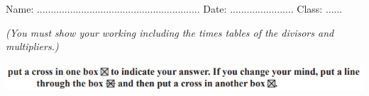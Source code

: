 \documentclass{article}
\date{}
\begin{document}
\fontsize{13}{15} \selectfont %

\begin{center}
  \qquad \\ 
\end{center} \\ 

Name: ...........................................................  \hspace{0.5cm}  Date: ....................... \hspace{0.5cm}  Class: ......\hspace{0.5cm} %

\par
\vspace*{5pt} 
\textit{(You must show your working including the times tables of the divisors and multipliers.)  }

\begin{center}
    \includegraphics[width=15cm]{Year_6_Mixed_Tests/Xx.png}
\end{center}
 \\
\end{document}
